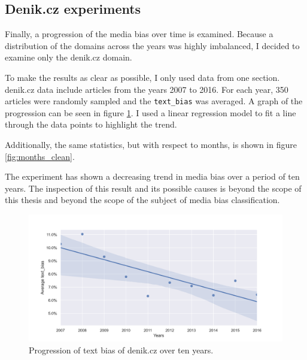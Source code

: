 


\subsection{Denik.cz experiments}
Finally, a progression of the media bias over time is examined. Because a distribution of the domains across the years was highly imbalanced, I decided to examine only the denik.cz domain.

To make the results as clear as possible, I only used data from one section. denik.cz data include articles from the years 2007 to 2016. For each year, 350 articles were randomly sampled and the \verb|text_bias| was averaged. A graph of the progression can be seen in figure \ref{fig:denik_years}. I used a linear regression model to fit a line through the data points to highlight the trend.

Additionally, the same statistics, but with respect to months, is shown in figure \ref{fig:months_clean}.

The experiment has shown a decreasing trend in media bias over a period of ten years. The inspection of this result and its possible causes is beyond the scope of this thesis and beyond the scope of the subject of media bias classification. 
\newpage


\begin{figure}[h]

  \includegraphics[scale=0.5]{my_modules/multimedia/inference/denik_years.png}
  \caption{Progression of text bias of denik.cz over ten years.}
  \label{fig:denik_years}

\end{figure}


